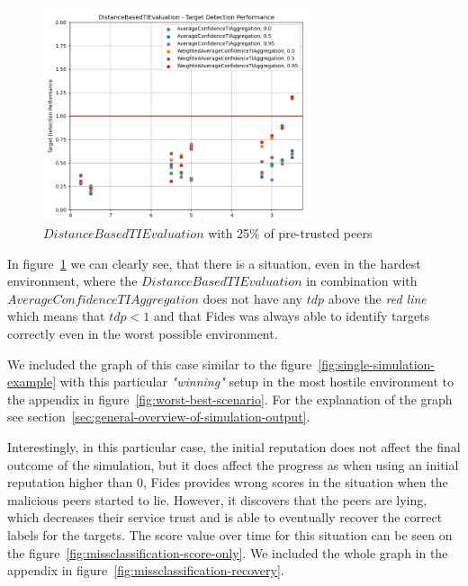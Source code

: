 \begin{figure}[h]
    \centering
    \includegraphics[width=0.7\textwidth]{assets/25_distance_detection_detail.png}
    \caption{$DistanceBasedTIEvaluation$ with 25\% of pre-trusted peers}
    \label{fig:distance-detection-detail-25}
\end{figure}

In figure~\ref{fig:distance-detection-detail-25} we can clearly see, that there is a situation, even in the hardest environment, where the $DistanceBasedTIEvaluation$ in combination with $AverageConfidenceTIAggregation$ does not have any $tdp$ above the \textit{red line} which means that $tdp < 1$ and that Fides was always able to identify targets correctly even in the worst possible environment.

We included the graph of this case similar to the figure~\ref{fig:single-simulation-example} with this particular \textit{"winning"} setup in the most hostile environment to the appendix in figure~\ref{fig:worst-best-scenario}. For the explanation of the graph see section~\ref{sec:general-overview-of-simulation-output}.

Interestingly, in this particular case, the initial reputation does not affect the final outcome of the simulation, but it does affect the progress as when using an initial reputation higher than $0$, Fides provides wrong scores in the situation when the malicious peers started to lie.
However, it discovers that the peers are lying, which decreases their service trust and is able to eventually recover the correct labels for the targets.
The score value over time for this situation can be seen on the figure~\ref{fig:missclassification-score-only}.
We included the whole graph in the appendix in figure~\ref{fig:missclassification-recovery}.

